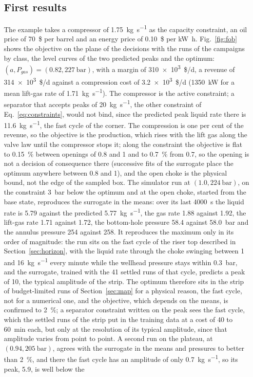 \documentclass[a4paper,fleqn]{cas-sc}
\begin{document}
\subsection{First results}\label{sec:optresults}

The example takes a compressor of \SI{1.75}{\kilogram\per\second} as the capacity constraint, an oil price of \SI{70}{\$} per barrel and an energy price of \SI{0.10}{\$} per \si{\kilo\watt\hour}. Fig.~\ref{fig:fob} shows the objective on the plane of the decisions with the runs of the campaigns by class, the level curves of the two predicted peaks and the optimum: $(a, P_{gas}) = (0.82, \SI{227}{\bar})$, with a margin of \num{310e3}~\$/d, a revenue of \num{314e3}~\$/d against a compression cost of \num{3.2e3}~\$/d (\SI{1350}{\kilo\watt} for a mean lift-gas rate of \SI{1.71}{\kilogram\per\second}). The compressor is the active constraint; a separator that accepts peaks of \SI{20}{\kilogram\per\second}, the other constraint of Eq.~\eqref{eq:constraints}, would not bind, since the predicted peak liquid rate there is \SI{11.6}{\kilogram\per\second}, the fast cycle of the corner. The compression is one per cent of the revenue, so the objective is the production, which rises with the lift gas along the valve law until the compressor stops it; along the constraint the objective is flat to \SI{0.15}{\percent} between openings of 0.8 and 1 and to \SI{0.7}{\percent} from 0.7, so the opening is not a decision of consequence there (successive fits of the surrogate place the optimum anywhere between 0.8 and 1), and the open choke is the physical bound, not the edge of the sampled box. The simulator run at $(1.0, \SI{224}{\bar})$, on the constraint \SI{3}{\bar} below the optimum and at the open choke, started from the base state, reproduces the surrogate in the means: over its last \SI{4000}{\second} the liquid rate is 5.79 against the predicted \SI{5.77}{\kilogram\per\second}, the gas rate 1.88 against 1.92, the lift-gas rate 1.71 against 1.72, the bottom-hole pressure 58.4 against \SI{58.0}{\bar} and the annulus pressure 254 against 258. It reproduces the maximum only in its order of magnitude: the run sits on the fast cycle of the riser top described in Section~\ref{sec:horizon}, with the liquid rate through the choke swinging between 1 and \SI{16}{\kilogram\per\second} every minute while the wellhead pressure stays within \SI{0.3}{\bar}, and the surrogate, trained with the 41 settled runs of that cycle, predicts a peak of 10, the typical amplitude of the strip. The optimum therefore sits in the strip of budget-limited runs of Section~\ref{sec:map} for a physical reason, the fast cycle, not for a numerical one, and the objective, which depends on the means, is confirmed to \SI{2}{\percent}; a separator constraint written on the peak sees the fast cycle, which the settled runs of the strip put in the training data at a cost of 40 to \SI{60}{\minute} each, but only at the resolution of its typical amplitude, since that amplitude varies from point to point. A second run on the plateau, at $(0.94, \SI{205}{\bar})$, agrees with the surrogate in the means and pressures to better than \SI{2}{\percent}, and there the fast cycle has an amplitude of only \SI{0.7}{\kilogram\per\second}, so its peak, 5.9, is well below the 
\end{document}

